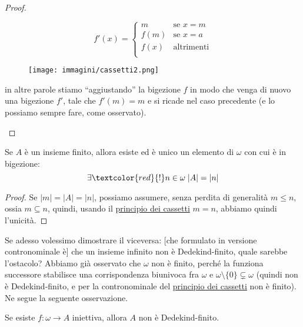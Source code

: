 \documentclass[11pt]{scrartcl}
\begin{document}
\begin{proof}
\begin{itemize}
		\[ f'(x) = \begin{cases}
			m &\text{se $x = m$} \\
			f(m) &\text{se $x = a$} \\
			f(x) &\text{altrimenti} \\
		\end{cases}
			\]
			\begin{figure}[H]
				\centering
				\texttt{[image: immagini/cassetti2.png]}
			\end{figure}
		in altre parole stiamo ``aggiustando'' la bigezione $f$ in modo che venga di nuovo una bigezione $f'$, tale che $f'(m) = m$ e si ricade nel caso precedente (e lo possiamo sempre fare, come osservato).
	\end{itemize}
\end{proof}

\begin{corollary}
	Se $A$ è un insieme finito, allora esiste ed è unico un elemento di $\omega$ con cui è in bigezione:
	\[ \exists \textcolor{red}{!} n \in \omega \; |A| = |n|
		\]
\end{corollary}

\begin{proof}
	Se $|m| = |A| = |n|$, possiamo assumere, senza perdita di generalità $m \leq n$, ossia $m \subseteq n$, quindi, usando il \hyperref[cassetti]{principio dei cassetti} $m = n$, abbiamo quindi l'unicità.
\end{proof}

Se adesso volessimo dimostrare il viceversa: [che formulato in versione contronominale è] che un insieme infinito non è Dedekind-finito, quale sarebbe l'ostacolo? Abbiamo già osservato che $\omega$ non è finito, perché la funziona successore 
stabilisce una corrispondenza biunivoca fra $\omega$ e $\omega \setminus\{0\} \subsetneq \omega$ (quindi non è Dedekind-finito, e per la contronominale del \hyperref[cassetti]{principio dei cassetti} non è finito). Ne segue la seguente osservazione.

\begin{remark}
	Se esiste $f : \omega \rightarrow A$ iniettiva, allora $A$ non è Dedekind-finito.
\end{remark}
\end{document}
